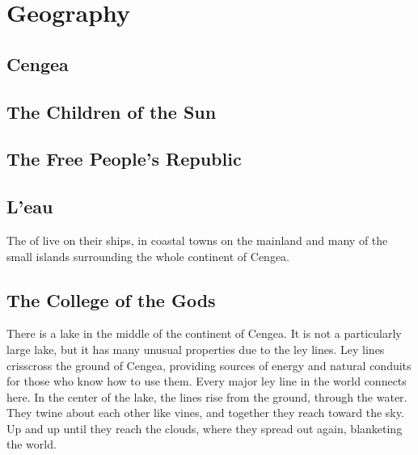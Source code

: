 \documentclass[blue]{GL2020}
\begin{document}

\section*{Geography}
\subsection*{Cengea}


\subsection*{The Children of the Sun}


\subsection*{The Free People's Republic}


\subsection*{L'eau}
The \pShippies{} of \pShip{} live on their ships, in coastal towns on the mainland and many of the small islands surrounding the whole continent of Cengea.
\subsection*{The College of the Gods}
There is a lake in the middle of the continent of Cengea. It is not a particularly large lake, but it has many unusual properties due to the ley lines. Ley lines crisscross the ground of Cengea, providing sources of energy and natural conduits for those who know how to use them. Every major ley line in the world connects here. In the center of the lake, the lines rise from the ground, through the water. They twine about each other like vines, and together they reach toward the sky. Up and up until they reach the clouds, where they spread out again, blanketing the world.
\end{document}

